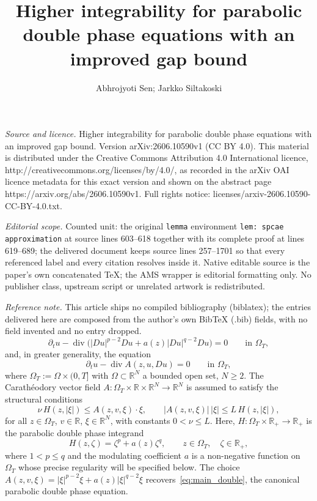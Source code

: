\documentclass[10pt,a4paper]{amsart}
\numberwithin{equation}{section}
\newcommand{\RR}{\mathds{R}}
\begin{document}
\title[Higher integrability for parabolic double phase equations wi]{Higher integrability for parabolic double phase equations with an improved gap bound}
\author{Abhrojyoti Sen; Jarkko Siltakoski}
\date{}
\maketitle
\noindent\emph{Source and licence.} Higher integrability for parabolic double phase equations with an improved gap bound. Version arXiv:2606.10590v1 (CC BY 4.0). This material is distributed under the Creative Commons Attribution 4.0 International licence, http://creativecommons.org/licenses/by/4.0/, as recorded in the arXiv OAI licence metadata for this exact version and shown on the abstract page https://arxiv.org/abs/2606.10590v1. Full rights notice: licenses/arxiv-2606.10590-CC-BY-4.0.txt.\par\smallskip
\noindent\textit{Editorial scope.} Counted unit: the original \texttt{lemma} environment \texttt{lem: spcae approximation} at source lines 603--618 together with its complete proof at lines 619--689; the delivered document keeps source lines 257--1701 so that every referenced label and every citation resolves inside it. Native editable source is the paper's own concatenated TeX; the AMS wrapper is editorial formatting only. No publisher class, upstream script or unrelated artwork is redistributed.
\par\smallskip\noindent\textit{Reference note.} This article ships no compiled bibliography (biblatex); the entries delivered here are composed from the author's own BibTeX (.bib) fields, with no field invented and no entry dropped.
\begin{equation}\label{eq:main_double}
  \partial_t u - \operatorname{div}\!\bigl(|Du|^{p-2}Du + a(z)|Du|^{q-2}Du\bigr)
  = 0 \qquad \text{in } \Omega_T,
\end{equation}
and, in greater generality, the equation
\begin{equation}\label{eq:main equation}
  \partial_t u - \operatorname{div} A(z, u, Du) = 0 \qquad \text{in } \Omega_T,
\end{equation}
where $\Omega_T := \Omega \times (0, T]$ with $\Omega \subset \RR^N$ a
bounded open set, $N\ge 2$. The Carath\'eodory vector field
$A : \Omega_T \times \RR \times \RR^N \to \RR^N$ is
assumed to satisfy the structural conditions
\begin{equation}\label{eq:growth_cond}
  \nu\, H(z, |\xi|) \le A(z, v, \xi) \cdot \xi,
  \qquad
  |A(z, v, \xi)|\,|\xi| \le L\, H(z, |\xi|),
\end{equation}
for all $z \in \Omega_T$, $v \in \RR$, $\xi \in \RR^N$, with
constants $0 < \nu \le L$. Here, $H : \Omega_T \times \RR_+ \to
\RR_+$ is the parabolic double phase integrand
\[
  H(z, \zeta) = \zeta^p + a(z)\zeta^q,
  \qquad z \in \Omega_T,\quad \zeta \in \RR_+,
\]
where $1 < p \le q$ and the modulating coefficient $a$ is a non-negative
function on $\Omega_T$ whose precise regularity will be specified below.
The choice $A(z, v, \xi) = |\xi|^{p-2}\xi + a(z)|\xi|^{q-2}\xi$
recovers~\eqref{eq:main_double}, the canonical parabolic double phase equation.
\end{document}
